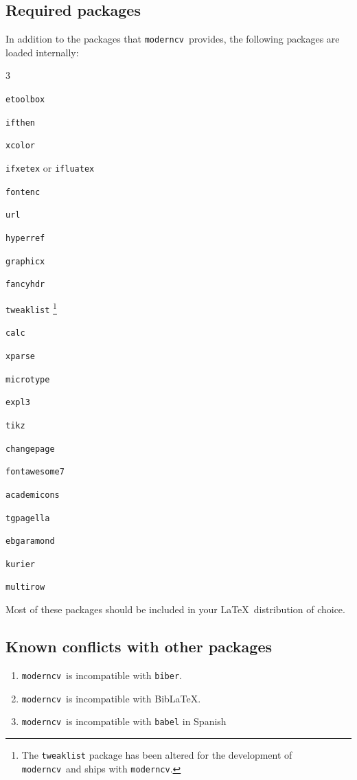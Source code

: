 \documentclass[a4paper, 11pt]{article}
\newcommand{\code}[1]{\lstinline!#1!}
\newcommand{\moderncv}{\code{moderncv}}
\newcommand{\Moderncv}{\moderncv~}
\newcommand{\Latex}{\LaTeX~}
\newcommand{\biblatex}{BibLaTeX}
\begin{document}
\subsection{Required packages}
\label{section:implementationDetails:requiredPackages}
In addition to the packages that \Moderncv provides, the following packages are loaded internally:
\begin{itemize}
  \begin{multicols}{3}
    \item \code{etoolbox}
    \item \code{ifthen}
    \item \code{xcolor}
    \item \code{ifxetex} or \code{ifluatex}
    \item \code{fontenc}
    \item \code{url}
    \item \code{hyperref}
    \item \code{graphicx}
    \item \code{fancyhdr}
    \item \code{tweaklist}%
    \footnote{The \code{tweaklist} package has been altered for the development of \Moderncv and ships with \moderncv.}
    \item \code{calc}
    \item \code{xparse}
    \item \code{microtype}
    \item \code{expl3}
    \item \code{tikz}
    \item \code{changepage}
    \item \code{fontawesome7}
    \item \code{academicons}
    \item \code{tgpagella}
    \item \code{ebgaramond}
    \item \code{kurier}
    \item \code{multirow}

  \end{multicols}
\end{itemize}

Most of these packages should be included in your \Latex distribution of choice.

\subsection{Known conflicts with other packages}
\begin{enumerate}
  \item \Moderncv is incompatible with \code{biber}.
  \item \Moderncv is incompatible with \biblatex.
  \item \Moderncv is incompatible with \code{babel} in Spanish
\end{enumerate}
\end{document}
